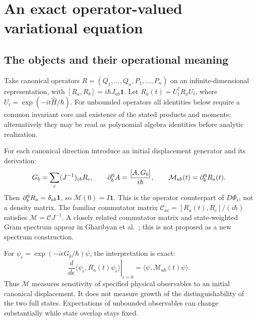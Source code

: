 \documentclass[11pt,a4paper]{article}
\newcommand{\id}{\mathbf{1}}
\begin{document}
\section{An exact operator-valued variational equation}
\subsection{The objects and their operational meaning}
Take canonical operators $R=(Q_1,\ldots,Q_n,P_1,\ldots,P_n)$ on an infinite-dimensional representation, with $[R_a,R_b]=i\hbar J_{ab}\id$. Let $R_a(t)=U_t^\dagger R_aU_t$, where $U_t=\exp(-it\widehat H/\hbar)$. For unbounded operators all identities below require a common invariant core and existence of the stated products and moments; alternatively they may be read as polynomial algebra identities before analytic realization.

For each canonical direction introduce an initial displacement generator and its derivation:
\[G_b=\sum_c(J^{-1})_{cb}R_c,\qquad\partial_b^{\rm q}A=\frac{[A,G_b]}{i\hbar},\qquad\mathcal M_{ab}(t)=\partial_b^{\rm q}R_a(t).\]
Then $\partial_b^{\rm q}R_a=\delta_{ab}\id$, so $\mathcal M(0)=I\id$. This is the operator counterpart of $D\Phi_t$, not a density matrix. The familiar commutator matrix $\mathcal C_{ac}=[R_a(t),R_c]/(i\hbar)$ satisfies $\mathcal M=\mathcal C J^{-1}$. A closely related commutator matrix and state-weighted Gram spectrum appear in Gharibyan et al.\ \cite[Sec.~3, Eqs.~(10)--(11)]{gharibyan}; this is not proposed as a new spectrum construction.

For $\psi_\epsilon=\exp(-i\epsilon G_b/\hbar)\psi$, the interpretation is exact:
\[\left.\frac{d}{d\epsilon}\langle\psi_\epsilon,R_a(t)\psi_\epsilon\rangle\right|_{\epsilon=0}=\langle\psi,\mathcal M_{ab}(t)\psi\rangle.\]
Thus $\mathcal M$ measures sensitivity of specified physical observables to an initial canonical displacement. It does not measure growth of the distinguishability of the two full states. Expectations of unbounded observables can change substantially while state overlap stays fixed.
\end{document}
